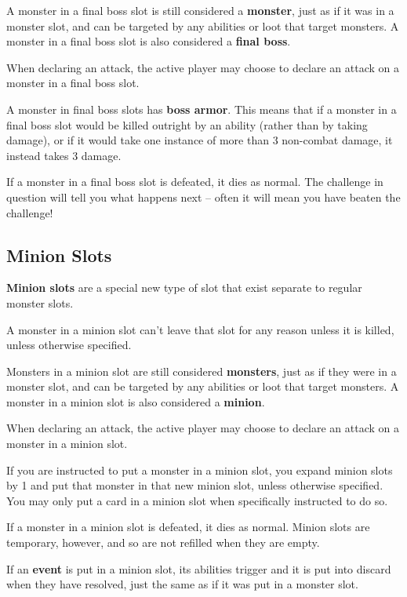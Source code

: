 \documentclass[a4paper, twoside]{report} %
\begin{document}
    A monster in a final boss slot is still considered a \textbf{monster}, just as if it was in a monster slot, and can be targeted by any abilities or loot that target monsters. A monster in a final boss slot is also considered a \textbf{final boss}.

    When declaring an attack, the active player may choose to declare an attack on a monster in a final boss slot.

    A monster in final boss slots has \textbf{boss armor}. This means that if a monster in a final boss slot would be killed outright by an ability (rather than by taking damage), or if it would take one instance of more than 3 non-combat damage, it instead takes 3 damage.

    If a monster in a final boss slot is defeated, it dies as normal. The challenge in question will tell you what happens next – often it will mean you have beaten the challenge!

    \subsection*{Minion Slots}
    \textbf{Minion slots} are a special new type of slot that exist separate to regular monster slots.

    A monster in a minion slot can’t leave that slot for any reason unless it is killed, unless otherwise specified.

    Monsters in a minion slot are still considered \textbf{monsters}, just as if they were in a monster slot, and can be targeted by any abilities or loot that target monsters. A monster in a minion slot is also considered a \textbf{minion}.

    When declaring an attack, the active player may choose to declare an attack on a monster in a minion slot.

    If you are instructed to put a monster in a minion slot, you expand minion slots by 1 and put that monster in that new minion slot, unless otherwise specified. You may only put a card in a minion slot when specifically instructed to do so.

    If a monster in a minion slot is defeated, it dies as normal. Minion slots are temporary, however, and so are not refilled when they are empty.

    If an \textbf{event} is put in a minion slot, its abilities trigger and it is put into discard when they have resolved, just the same as if it was put in a monster slot.
\end{document}
